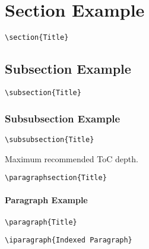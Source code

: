 \documentclass[itdr]{subfiles}
\begin{document}
\section{Section Example}
\begin{lstlisting}
\section{Title}
\end{lstlisting}

\subsection{Subsection Example}
\begin{lstlisting}
\subsection{Title}
\end{lstlisting}

\subsubsection{Subsubsection Example}
\begin{lstlisting}
\subsubsection{Title}
\end{lstlisting}

Maximum recommended ToC depth.

\begin{lstlisting}
\paragraphsection{Title}
\end{lstlisting}

\paragraph{Paragraph Example}
\begin{lstlisting}
\paragraph{Title}
\end{lstlisting}

\begin{lstlisting}
\iparagraph{Indexed Paragraph}
\end{lstlisting}
\end{document}
